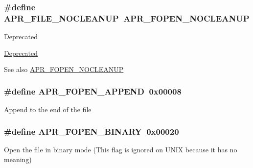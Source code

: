 \subsubsection[{\texorpdfstring{A\+P\+R\+\_\+\+F\+I\+L\+E\+\_\+\+N\+O\+C\+L\+E\+A\+N\+UP}{APR_FILE_NOCLEANUP}}]{\setlength{\rightskip}{0pt plus 5cm}\#define A\+P\+R\+\_\+\+F\+I\+L\+E\+\_\+\+N\+O\+C\+L\+E\+A\+N\+UP~{\bf A\+P\+R\+\_\+\+F\+O\+P\+E\+N\+\_\+\+N\+O\+C\+L\+E\+A\+N\+UP}}\hypertarget{group__apr__file__open__flags_ga3ef1061dbb3adf595701bd12edb062f9}{}\label{group__apr__file__open__flags_ga3ef1061dbb3adf595701bd12edb062f9}
\begin{DoxyRefDesc}{Deprecated}
\item[\hyperlink{deprecated__deprecated000028}{Deprecated}]\end{DoxyRefDesc}
\begin{DoxySeeAlso}{See also}
\hyperlink{group__apr__file__open__flags_ga3fc9b5a7791d9f462997cd29de67eb80}{A\+P\+R\+\_\+\+F\+O\+P\+E\+N\+\_\+\+N\+O\+C\+L\+E\+A\+N\+UP} 
\end{DoxySeeAlso}
\subsubsection[{\texorpdfstring{A\+P\+R\+\_\+\+F\+O\+P\+E\+N\+\_\+\+A\+P\+P\+E\+ND}{APR_FOPEN_APPEND}}]{\setlength{\rightskip}{0pt plus 5cm}\#define A\+P\+R\+\_\+\+F\+O\+P\+E\+N\+\_\+\+A\+P\+P\+E\+ND~0x00008}\hypertarget{group__apr__file__open__flags_ga45f353db9b71d4760a3f35cf3781cfc8}{}\label{group__apr__file__open__flags_ga45f353db9b71d4760a3f35cf3781cfc8}
Append to the end of the file 
\subsubsection[{\texorpdfstring{A\+P\+R\+\_\+\+F\+O\+P\+E\+N\+\_\+\+B\+I\+N\+A\+RY}{APR_FOPEN_BINARY}}]{\setlength{\rightskip}{0pt plus 5cm}\#define A\+P\+R\+\_\+\+F\+O\+P\+E\+N\+\_\+\+B\+I\+N\+A\+RY~0x00020}\hypertarget{group__apr__file__open__flags_gacb20b3028864f34cb26314fe2cacc3fa}{}\label{group__apr__file__open__flags_gacb20b3028864f34cb26314fe2cacc3fa}
Open the file in binary mode (This flag is ignored on U\+N\+IX because it has no meaning) 
